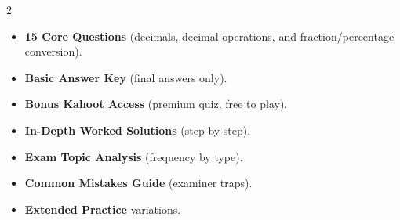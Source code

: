 \documentclass[11pt,a4paper]{article}
\newcommand{\FullReleaseDate}{April 30, 2026}
\begin{document}
\vspace{8pt}

\begin{multicols}{2}
  \begin{tcolorbox}[card, title=\sffamily\bfseries\textcolor{white}{\faHandPointDown\ TODAY (Simplified Version)}, colbacktitle=mainblue, boxed title style={sharp corners, boxrule=0pt}]
    \begin{itemize}[leftmargin=1.2em, itemsep=2pt]
      \item \small \textbf{15 Core Questions} (decimals, decimal operations, and fraction/percentage conversion).
      \item \small \textbf{Basic Answer Key} (final answers only).
      \item \small \textbf{Bonus Kahoot Access} (premium quiz, free to play).
    \end{itemize}
  \end{tcolorbox}

  \columnbreak

  \begin{tcolorbox}[card, title=\sffamily\bfseries\textcolor{white}{\faRocket\ ON \FullReleaseDate\ (Full Upgrade)}, colbacktitle=mainblue, boxed title style={sharp corners, boxrule=0pt}]
    \begin{itemize}[leftmargin=1.2em, itemsep=2pt]
      \item \small \textbf{In-Depth Worked Solutions} (step-by-step).
      \item \small \textbf{Exam Topic Analysis} (frequency by type).
      \item \small \textbf{Common Mistakes Guide} (examiner traps).
      \item \small \textbf{Extended Practice} variations.
    \end{itemize}
  \end{tcolorbox}
\end{multicols}
\end{document}
